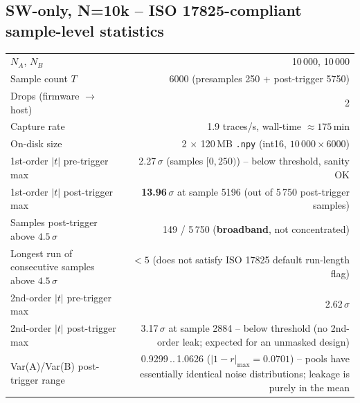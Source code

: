 \documentclass[11pt]{article}
\begin{document}
\subsection{SW-only, N=10k -- ISO 17825-compliant sample-level statistics}

\begin{tabularx}{\linewidth}{@{}lr@{}}
\toprule
$N_A$, $N_B$               & 10\,000, 10\,000 \\
Sample count $T$           & 6000 (presamples 250 + post-trigger 5750) \\
Drops (firmware $\to$ host)  & 2 \\
Capture rate               & 1.9 traces/s, wall-time $\approx 175$\,min \\
On-disk size               & 2 $\times$ 120\,MB \texttt{.npy} (int16, $10\,000 \times 6000$) \\
\midrule
1st-order $|t|$ pre-trigger max   & 2.27\,$\sigma$ (samples $[0,250)$) -- below threshold, sanity OK \\
1st-order $|t|$ post-trigger max  & \textbf{13.96\,$\sigma$} at sample 5196 (out of 5\,750 post-trigger samples) \\
Samples post-trigger above $4.5\,\sigma$ & 149 / 5\,750 (\textbf{broadband}, not concentrated) \\
Longest run of consecutive samples above $4.5\,\sigma$ & $< 5$ (does not satisfy ISO 17825 default run-length flag) \\
\midrule
2nd-order $|t|$ pre-trigger max   & 2.62\,$\sigma$ \\
2nd-order $|t|$ post-trigger max  & 3.17\,$\sigma$ at sample 2884 -- below threshold (no 2nd-order leak; expected for an unmasked design) \\
\midrule
Var(A)/Var(B) post-trigger range  & 0.9299\,..\,1.0626 ($|1-r|_{\max}=0.0701$) -- pools have essentially identical noise distributions; leakage is purely in the mean \\
\bottomrule
\end{tabularx}
\end{document}
